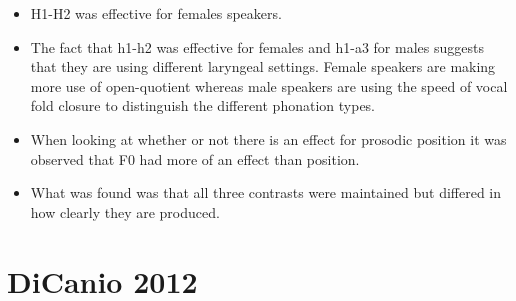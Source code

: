 \documentclass[12pt, letterpaper]{article}
\begin{document}
\begin{itemize}
	\item H1-H2 was effective for females speakers. 
	\item The fact that h1-h2 was effective for females and h1-a3 for males suggests that they are using different laryngeal settings. Female speakers are making more use of open-quotient whereas male speakers are using the speed of vocal fold closure to distinguish the different phonation types. 
	\item When looking at whether or not there is an effect for prosodic position it was observed that F0 had more of an effect than position. 
	\item What was found was that all three contrasts were maintained but differed in how clearly they are produced. 
\end{itemize}

\section{DiCanio 2012} \label{sec:DiCanio}
\end{document}
